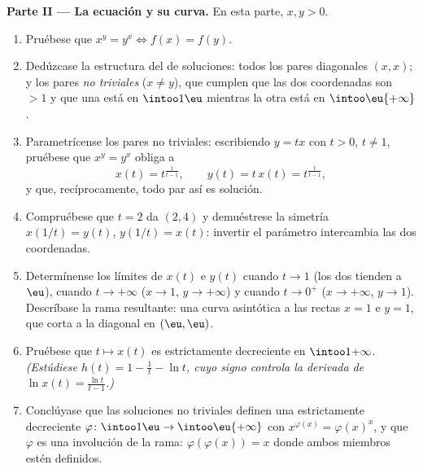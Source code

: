 \begin{problem}
\medskip
\noindent\textbf{Parte II --- La ecuación y su curva.} En esta parte,
$x, y > 0$.
\begin{enumerate}[resume]
  \item Pruébese que $x^y = y^x \iff f(x) = f(y)$.
  \item Dedúzcase la estructura del  de soluciones: todos los
        pares diagonales $(x, x)$; y los pares \emph{no triviales}
        ($x \neq y$), que cumplen que las dos coordenadas son $> 1$ y
        que una está en $\intoo1\eu$ mientras la otra está en
        $\intoo\eu{+\infty}$.
  \item Parametrícense los pares no triviales: escribiendo $y = tx$ con
        $t > 0$, $t \neq 1$, pruébese que $x^y = y^x$ obliga a
        \[
        x(t) = t^{\frac1{t-1}},
        \qquad
        y(t) = t\,x(t) = t^{\frac{t}{t-1}},
        \]
        y que, recíprocamente, todo par así es solución.
  \item Compruébese que $t = 2$ da $(2, 4)$ y demuéstrese la simetría
        $x(1/t) = y(t)$, $y(1/t) = x(t)$: invertir el parámetro
        intercambia las dos coordenadas.
  \item Determínense los límites de $x(t)$ e $y(t)$ cuando $t \to 1$
        (los dos tienden a $\eu$), cuando $t \to +\infty$ ($x \to 1$,
        $y \to +\infty$) y cuando $t \to 0^+$ ($x \to +\infty$,
        $y \to 1$). Descríbase la rama resultante: una curva asintótica
        a las rectas $x = 1$ e $y = 1$, que corta a la diagonal en
        $(\eu, \eu)$.
  \item Pruébese que $t \mapsto x(t)$ es estrictamente decreciente en
        $\intoo1{+\infty}$. \emph{(Estúdiese $h(t) = 1 - \frac1t - \ln
        t$, cuyo signo controla la derivada de $\ln x(t) =
        \frac{\ln t}{t - 1}$.)}
  \item Conclúyase que las soluciones no triviales definen una
         estrictamente decreciente $\varphi \colon \intoo1\eu
        \to \intoo\eu{+\infty}$ con $x^{\varphi(x)} = \varphi(x)^x$, y
        que $\varphi$ es una involución de la rama:
        $\varphi(\varphi(x)) = x$ donde ambos miembros estén definidos.
\end{enumerate}


\end{problem}
